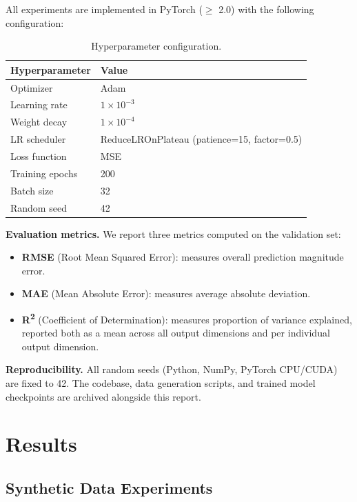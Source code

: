 \documentclass[a4paper,11pt]{article}
\begin{document}
All experiments are implemented in PyTorch ($\geq$ 2.0) with the following configuration:

\begin{table}[htbp]
\centering
\caption{Hyperparameter configuration.}
\label{tab:hyperparameters}
\begin{tabular}{ll}
\toprule
Hyperparameter & Value \\
\midrule
Optimizer & Adam \\
Learning rate & $1 \times 10^{-3}$ \\
Weight decay & $1 \times 10^{-4}$ \\
LR scheduler & ReduceLROnPlateau (patience=15, factor=0.5) \\
Loss function & MSE \\
Training epochs & 200 \\
Batch size & 32 \\
Random seed & 42 \\
\bottomrule
\end{tabular}
\end{table}

\textbf{Evaluation metrics.} We report three metrics computed on the validation set:

\begin{itemize}
    \item \textbf{RMSE} (Root Mean Squared Error): measures overall prediction magnitude error.
    \item \textbf{MAE} (Mean Absolute Error): measures average absolute deviation.
    \item \textbf{R\textsuperscript{2}} (Coefficient of Determination): measures proportion of variance explained, reported both as a mean across all output dimensions and per individual output dimension.
\end{itemize}

\textbf{Reproducibility.} All random seeds (Python, NumPy, PyTorch CPU/CUDA) are fixed to 42. The codebase, data generation scripts, and trained model checkpoints are archived alongside this report.

\section{Results}
\label{sec:results}

\subsection{Synthetic Data Experiments}
\label{subsec:synthetic_results}
\end{document}
